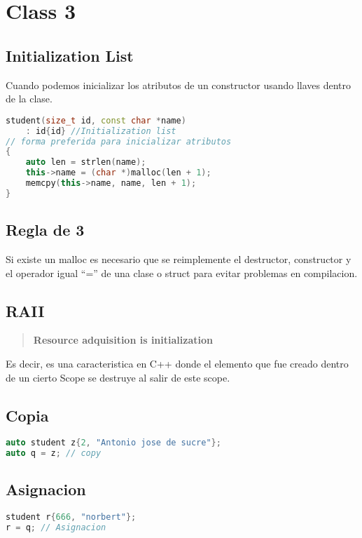 \documentclass[11pt,letterpaper]{article}
\begin{document}
\section{Class 3}
\subsection{Initialization List}
Cuando podemos inicializar los atributos de un constructor usando llaves dentro de la clase.
\begin{lstlisting}[language=C++, caption={Inicializacion con llaves en constructor}]
student(size_t id, const char *name)
    : id{id} //Initialization list
// forma preferida para inicializar atributos
{
    auto len = strlen(name);
    this->name = (char *)malloc(len + 1);
    memcpy(this->name, name, len + 1);
}
\end{lstlisting}

\subsection{Regla de 3}
Si existe un malloc es necesario que se reimplemente el destructor, constructor y el operador igual “=”
de una clase o struct para evitar problemas en compilacion.

\subsection{RAII}
\begin{quotation}
    \textbf{Resource adquisition is initialization}
\end{quotation}
Es decir, es una caracteristica en C++ donde el elemento que fue creado dentro de un cierto Scope
se destruye al salir de este scope.

\subsection{Copia}
\begin{lstlisting}[language=C++, caption={Copia}]
auto student z{2, "Antonio jose de sucre"};
auto q = z; // copy
\end{lstlisting}
\subsection{Asignacion}
\begin{lstlisting}[language=C++, caption={Asignacion}]
student r{666, "norbert"};
r = q; // Asignacion
\end{lstlisting}
\end{document}
